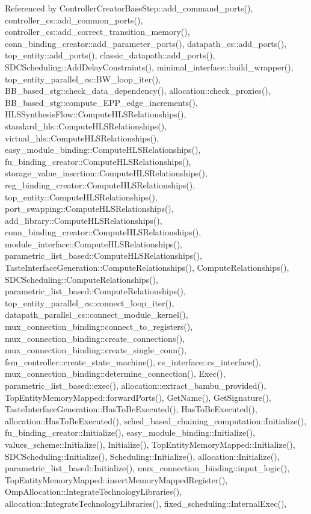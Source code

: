 Referenced by Controller\+Creator\+Base\+Step\+::add\+\_\+command\+\_\+ports(), controller\+\_\+cs\+::add\+\_\+common\+\_\+ports(), controller\+\_\+cs\+::add\+\_\+correct\+\_\+transition\+\_\+memory(), conn\+\_\+binding\+\_\+creator\+::add\+\_\+parameter\+\_\+ports(), datapath\+\_\+cs\+::add\+\_\+ports(), top\+\_\+entity\+::add\+\_\+ports(), classic\+\_\+datapath\+::add\+\_\+ports(), S\+D\+C\+Scheduling\+::\+Add\+Delay\+Constraints(), minimal\+\_\+interface\+::build\+\_\+wrapper(), top\+\_\+entity\+\_\+parallel\+\_\+cs\+::\+B\+W\+\_\+loop\+\_\+iter(), B\+B\+\_\+based\+\_\+stg\+::check\+\_\+data\+\_\+dependency(), allocation\+::check\+\_\+proxies(), B\+B\+\_\+based\+\_\+stg\+::compute\+\_\+\+E\+P\+P\+\_\+edge\+\_\+increments(), H\+L\+S\+Synthesis\+Flow\+::\+Compute\+H\+L\+S\+Relationships(), standard\+\_\+hls\+::\+Compute\+H\+L\+S\+Relationships(), virtual\+\_\+hls\+::\+Compute\+H\+L\+S\+Relationships(), easy\+\_\+module\+\_\+binding\+::\+Compute\+H\+L\+S\+Relationships(), fu\+\_\+binding\+\_\+creator\+::\+Compute\+H\+L\+S\+Relationships(), storage\+\_\+value\+\_\+insertion\+::\+Compute\+H\+L\+S\+Relationships(), reg\+\_\+binding\+\_\+creator\+::\+Compute\+H\+L\+S\+Relationships(), top\+\_\+entity\+::\+Compute\+H\+L\+S\+Relationships(), port\+\_\+swapping\+::\+Compute\+H\+L\+S\+Relationships(), add\+\_\+library\+::\+Compute\+H\+L\+S\+Relationships(), conn\+\_\+binding\+\_\+creator\+::\+Compute\+H\+L\+S\+Relationships(), module\+\_\+interface\+::\+Compute\+H\+L\+S\+Relationships(), parametric\+\_\+list\+\_\+based\+::\+Compute\+H\+L\+S\+Relationships(), Taste\+Interface\+Generation\+::\+Compute\+Relationships(), Compute\+Relationships(), S\+D\+C\+Scheduling\+::\+Compute\+Relationships(), parametric\+\_\+list\+\_\+based\+::\+Compute\+Relationships(), top\+\_\+entity\+\_\+parallel\+\_\+cs\+::connect\+\_\+loop\+\_\+iter(), datapath\+\_\+parallel\+\_\+cs\+::connect\+\_\+module\+\_\+kernel(), mux\+\_\+connection\+\_\+binding\+::connect\+\_\+to\+\_\+registers(), mux\+\_\+connection\+\_\+binding\+::create\+\_\+connections(), mux\+\_\+connection\+\_\+binding\+::create\+\_\+single\+\_\+conn(), fsm\+\_\+controller\+::create\+\_\+state\+\_\+machine(), cs\+\_\+interface\+::cs\+\_\+interface(), mux\+\_\+connection\+\_\+binding\+::determine\+\_\+connection(), Exec(), parametric\+\_\+list\+\_\+based\+::exec(), allocation\+::extract\+\_\+bambu\+\_\+provided(), Top\+Entity\+Memory\+Mapped\+::forward\+Ports(), Get\+Name(), Get\+Signature(), Taste\+Interface\+Generation\+::\+Has\+To\+Be\+Executed(), Has\+To\+Be\+Executed(), allocation\+::\+Has\+To\+Be\+Executed(), sched\+\_\+based\+\_\+chaining\+\_\+computation\+::\+Initialize(), fu\+\_\+binding\+\_\+creator\+::\+Initialize(), easy\+\_\+module\+\_\+binding\+::\+Initialize(), values\+\_\+scheme\+::\+Initialize(), Initialize(), Top\+Entity\+Memory\+Mapped\+::\+Initialize(), S\+D\+C\+Scheduling\+::\+Initialize(), Scheduling\+::\+Initialize(), allocation\+::\+Initialize(), parametric\+\_\+list\+\_\+based\+::\+Initialize(), mux\+\_\+connection\+\_\+binding\+::input\+\_\+logic(), Top\+Entity\+Memory\+Mapped\+::insert\+Memory\+Mapped\+Register(), Omp\+Allocation\+::\+Integrate\+Technology\+Libraries(), allocation\+::\+Integrate\+Technology\+Libraries(), fixed\+\_\+scheduling\+::\+Internal\+Exec(), 